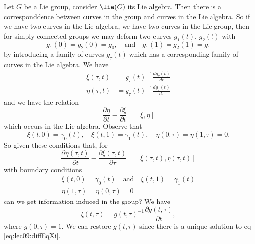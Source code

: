 
Let $G$ be a Lie group, consider $\lie(G)$ its Lie algebra. Then
there is a corresponddence between curves in the group and curves
in the Lie algebra. So if we have two curves in the Lie algebra,
we have two curves in the Lie group, then for simply connected
groups we may deform two curves $g_{1}(t)$, $g_{2}(t)$ with
\begin{equation}
g_{1}(0)=g_{2}(0)=g_{0},\quad\mbox{and}\quad
g_{1}(1)=g_{2}(1)=g_{1}
\end{equation}
by introducing a family of curves $g_{\tau}(t)$ which has a
corresponding family of curves in the Lie algebra. We have
\begin{subequations}
\begin{align}
\xi(\tau,t) &= g_{\tau}(t)^{-1}\frac{dg_{\tau}(t)}{dt}\\
\eta(\tau,t) &= g_{\tau}(t)^{-1}\frac{dg_{\tau}(t)}{d\tau}
\end{align}
\end{subequations}
and we have the relation
\begin{equation}
\frac{\partial\eta}{\partial t}-\frac{\partial\xi}{\partial t}=[\xi,\eta]
\end{equation}
which occurs in the Lie algebra. Observe that 
\begin{equation}
\xi(t,0)=\gamma_{0}(t),\quad\xi(t,1)=\gamma_{1}(t),\quad\eta(0,\tau)=\eta(1,\tau)=0.
\end{equation}
So given these conditions that, for
\begin{equation}
\frac{\partial\eta(\tau,t)}{\partial t}-\frac{\partial\xi(\tau,t)}{\partial\tau}
=[\xi(\tau,t),\eta(\tau,t)]
\end{equation}
with boundary conditions
\begin{subequations}
\begin{align}
\xi(t,0)=\gamma_{0}(t)\quad\mbox{and}\quad\xi(t,1)=\gamma_{1}(t)\\
\eta(1,\tau)=\eta(0,\tau)=0
\end{align}
\end{subequations}
can we get information induced in the group? We have
\begin{equation}\label{eq:lec09:diffEqXi}
\xi(t,\tau)=g(t,\tau)^{-1}\frac{\partial g(t,\tau)}{\partial t},
\end{equation}
where $g(0,\tau)=1$. We can restore $g(t,\tau)$ since there is a
unique solution to eq \eqref{eq:lec09:diffEqXi}.

